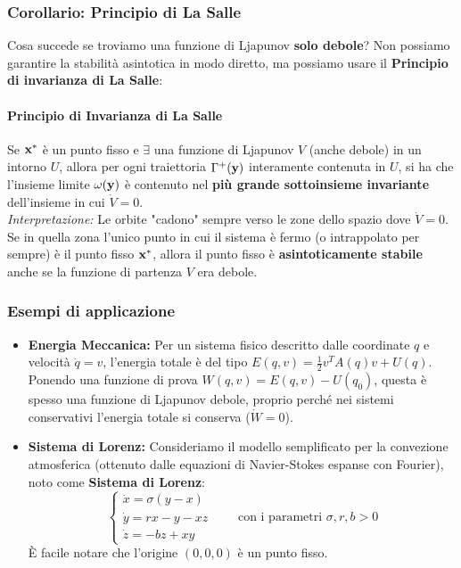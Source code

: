 \documentclass[openany]{book}
\theoremstyle{definition}
\theoremstyle{remark}
\begin{document}
\subsubsection{Corollario: Principio di La Salle}

Cosa succede se troviamo una funzione di Ljapunov \textbf{solo debole}? Non possiamo garantire la stabilità asintotica in modo diretto, ma possiamo usare il \textbf{Principio di invarianza di La Salle}:

\paragraph{Principio di Invarianza di La Salle}
Se $\vb{x}^*$ è un punto fisso e $\exists$ una funzione di Ljapunov $V$ (anche debole) in un intorno $U$, allora per ogni traiettoria $\Gamma^+(\vb{y})$ interamente contenuta in $U$, si ha che l'insieme limite $\omega(\vb{y})$ è contenuto nel \textbf{più grande sottoinsieme invariante} dell'insieme in cui $\dot{V} = 0$.
\\
\textit{Interpretazione:} Le orbite "cadono" sempre verso le zone dello spazio dove $\dot{V} = 0$. Se in quella zona l'unico punto in cui il sistema è fermo (o intrappolato per sempre) è il punto fisso $\vb{x}^*$, allora il punto fisso è \textbf{asintoticamente stabile} anche se la funzione di partenza $V$ era debole.


\subsubsection*{Esempi di applicazione}

\begin{itemize}
    \item \textbf{Energia Meccanica:} Per un sistema fisico descritto dalle coordinate $q$ e velocità $\dot{q} = v$, l'energia totale è del tipo $E(q,v) = \frac{1}{2} v^T A(q) v + U(q)$. Ponendo una funzione di prova $W(q,v) = E(q,v) - U(q_0)$, questa è spesso una funzione di Ljapunov debole, proprio perché nei sistemi conservativi l'energia totale si conserva ($\dot{W} = 0$).

    \item \textbf{Sistema di Lorenz:}
    Consideriamo il modello semplificato per la convezione atmosferica (ottenuto dalle equazioni di Navier-Stokes espanse con Fourier), noto come \textbf{Sistema di Lorenz}:
    \begin{equation}
        \begin{cases}
            \dot{x} = \sigma(y - x) \\
            \dot{y} = rx - y - xz \\
            \dot{z} = -bz + xy
        \end{cases}
        \qquad \text{con i parametri } \sigma, r, b > 0
    \end{equation}
    È facile notare che l'origine $(0,0,0)$ è un punto fisso.
\end{itemize}
\end{document}
